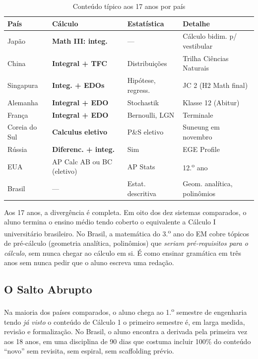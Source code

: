 \documentclass[12pt,a4paper,oneside]{article}
\begin{document}
\begin{table}[H]
\centering
\caption{Conteúdo típico aos 17 anos por país}
\label{tab:idade-17}
\small
\begin{tabular}{@{}lp{3.5cm}p{2.7cm}p{5cm}@{}}
\toprule
\textbf{País} & \textbf{Cálculo} & \textbf{Estatística} & \textbf{Detalhe} \\
\midrule
Japão          & \textbf{Math III: integ.}      & ---               & Cálculo bidim. p/ vestibular \\
China          & \textbf{Integral + TFC}        & Distribuições     & Trilha Ciências Naturais \\
Singapura      & \textbf{Integ. + EDOs}         & Hipótese, regress.& JC 2 (H2 Math final) \\
Alemanha       & \textbf{Integral + EDO}        & Stochastik        & Klasse 12 (Abitur) \\
França         & \textbf{Integral + EDO}        & Bernoulli, LGN    & Terminale \\
Coreia do Sul  & \textbf{Calculus eletivo}      & P\&S eletivo      & Suneung em novembro \\
Rússia         & \textbf{Diferenc. + integ.}    & Sim               & EGE Profile \\
EUA            & AP Calc AB ou BC (eletivo)     & AP Stats          & 12.\textsuperscript{o} ano \\
Brasil         & ---                            & Estat. descritiva & Geom. analítica, polinômios \\
\bottomrule
\end{tabular}
\end{table}

Aos 17 anos, a divergência é completa. Em oito dos dez sistemas
comparados, o aluno termina o ensino médio tendo coberto o
equivalente a Cálculo I universitário brasileiro. No Brasil, a
matemática do 3.\textsuperscript{o} ano do EM cobre tópicos de
pré-cálculo (geometria analítica, polinômios) que \emph{seriam
pré-requisitos para o cálculo}, sem nunca chegar ao cálculo em si.
É como ensinar gramática em três anos sem nunca pedir que o aluno
escreva uma redação.

\subsection{O Salto Abrupto}

Na maioria dos países comparados, o aluno chega ao
1.\textsuperscript{o} semestre de engenharia tendo \emph{já visto}
o conteúdo de Cálculo 1 \textemdash{} o primeiro semestre é, em
larga medida, revisão e formalização. No Brasil, o aluno encontra
a derivada pela primeira vez aos 18 anos, em uma disciplina de 90
dias que costuma incluir 100\% do conteúdo ``novo'' \textemdash{}
sem revisita, sem espiral, sem scaffolding prévio.
\end{document}
